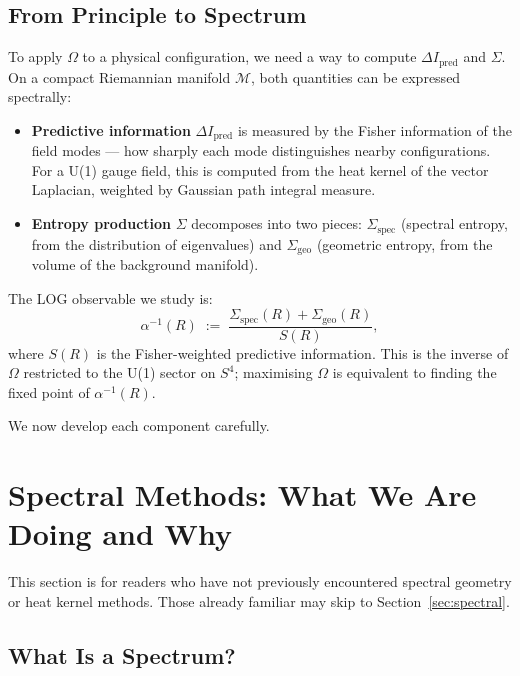 \documentclass[12pt,a4paper]{article}
\newcommand{\ai}{\alpha^{-1}}
\newcommand{\Sg}{\Sigma_{\mathrm{geo}}}
\newcommand{\Ss}{\Sigma_{\mathrm{spec}}}
\newcommand{\Om}{\Omega}
\begin{document}
\subsection{From Principle to Spectrum}
\label{sec:bridge}

To apply $\Om$ to a physical configuration, we need
a way to compute $\Delta I_{\mathrm{pred}}$ and $\Sigma$.
On a compact Riemannian manifold $\mathcal{M}$,
both quantities can be expressed spectrally:

\begin{itemize}
\item \textbf{Predictive information} $\Delta I_{\mathrm{pred}}$
  is measured by the Fisher information of the field
  modes --- how sharply each mode distinguishes nearby
  configurations.
  For a U(1) gauge field, this is computed from the
  heat kernel of the vector Laplacian, weighted by
  Gaussian path integral measure.

\item \textbf{Entropy production} $\Sigma$ decomposes
  into two pieces:
  $\Ss$ (spectral entropy, from the distribution
  of eigenvalues) and $\Sg$ (geometric entropy,
  from the volume of the background manifold).
\end{itemize}

The LOG observable we study is:
\begin{equation}
  \ai(R) \;:=\; \frac{\Ss(R) + \Sg(R)}{S(R)},
\label{eq:logobs}
\end{equation}
where $S(R)$ is the Fisher-weighted predictive information.
This is the inverse of $\Om$ restricted to the U(1) sector
on $S^4$; maximising $\Om$ is equivalent to finding
the fixed point of $\ai(R)$.

We now develop each component carefully.

\section{Spectral Methods: What We Are Doing and Why}
\label{sec:spectral_intro}

This section is for readers who have not previously
encountered spectral geometry or heat kernel methods.
Those already familiar may skip to
Section~\ref{sec:spectral}.

\subsection{What Is a Spectrum?}
\end{document}
